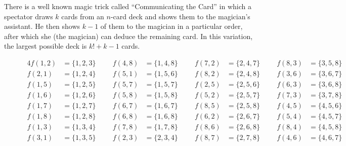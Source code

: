 \documentclass{article}
\begin{document}
There is a well known magic trick called ``Communicating the Card'' in which
a spectator draws $k$ cards from an $n$-card deck and shows them to the
magician's assistant. He then shows $k-1$ of them to the magician
in a particular order, after which she (the magician) can deduce the remaining
card. In this variation, the largest possible deck is $k! + k - 1$ cards.
\begin{figure}[!h]
  \centering
  \begin{alignat*}{4}
    f(1,2) &= \{1,2,3\} \hspace{1cm} f(4,8) &= \{1,4,8\} \hspace{1cm} f(7,2) &= \{2,4,7\} \hspace{1cm} f(8,3) &= \{3,5,8\}\\
    f(2,1) &= \{1,2,4\} \hspace{1cm} f(5,1) &= \{1,5,6\} \hspace{1cm} f(8,2) &= \{2,4,8\} \hspace{1cm} f(3,6) &= \{3,6,7\}\\
    f(1,5) &= \{1,2,5\} \hspace{1cm} f(5,7) &= \{1,5,7\} \hspace{1cm} f(2,5) &= \{2,5,6\} \hspace{1cm} f(6,3) &= \{3,6,8\}\\
    f(1,6) &= \{1,2,6\} \hspace{1cm} f(5,8) &= \{1,5,8\} \hspace{1cm} f(5,2) &= \{2,5,7\} \hspace{1cm} f(7,3) &= \{3,7,8\}\\
    f(1,7) &= \{1,2,7\} \hspace{1cm} f(6,7) &= \{1,6,7\} \hspace{1cm} f(8,5) &= \{2,5,8\} \hspace{1cm} f(4,5) &= \{4,5,6\}\\
    f(1,8) &= \{1,2,8\} \hspace{1cm} f(6,8) &= \{1,6,8\} \hspace{1cm} f(6,2) &= \{2,6,7\} \hspace{1cm} f(5,4) &= \{4,5,7\}\\
    f(1,3) &= \{1,3,4\} \hspace{1cm} f(7,8) &= \{1,7,8\} \hspace{1cm} f(8,6) &= \{2,6,8\} \hspace{1cm} f(8,4) &= \{4,5,8\}\\
    f(3,1) &= \{1,3,5\} \hspace{1cm} f(2,3) &= \{2,3,4\} \hspace{1cm} f(8,7) &= \{2,7,8\} \hspace{1cm} f(4,6) &= \{4,6,7\}\\

\end{alignat*}
\end{figure}
\end{document}
